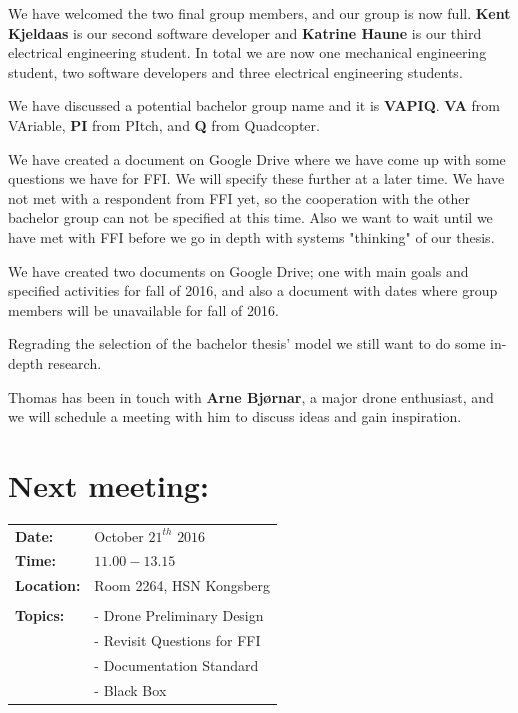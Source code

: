 \documentclass{article}
\begin{document}
We have welcomed the two final group members, and our group is now full. \textbf{Kent Kjeldaas} is our second software developer and \textbf{Katrine Haune} is our third electrical engineering student. In total we are now one mechanical engineering student, two software developers and three electrical engineering students. 

We have discussed a potential bachelor group name and it is \textbf{VAPIQ}. \textbf{VA} from VAriable, \textbf{PI} from PItch, and \textbf{Q} from Quadcopter.

We have created a document on Google Drive where we have come up with some questions we have for FFI. We will specify these further at a later time. We have not met with a respondent from FFI yet, so the cooperation with the other bachelor group can not be specified at this time. Also we want to wait until we have met with FFI before we go in depth with systems "thinking" of our thesis. 

We have created two documents on Google Drive; one with main goals and specified activities for fall of 2016, and also a document with dates where group members will be unavailable for fall of 2016. 

Regrading the selection of the bachelor thesis' model we still want to do some in-depth research. 

Thomas has been in touch with \textbf{Arne Bjørnar}, a major drone enthusiast, and we will schedule a meeting with him to discuss ideas and gain inspiration.




\section*{Next meeting:}   
\begin{tabular}{ll}                                              
\textbf{Date:} 	            & October $21^{th}$ $2016$	         \\
\textbf{Time:}		        & $11.00 - 13.15$				     \\
\textbf{Location:}	        & Room 2264, HSN Kongsberg	         \\\\
\textbf{Topics:}            & - Drone Preliminary Design         \\
				        	& - Revisit Questions for FFI        \\  
				        	& - Documentation Standard           \\
				        	& - Black Box                  	     \\
				        
				        	

\end{tabular}
\end{document}
